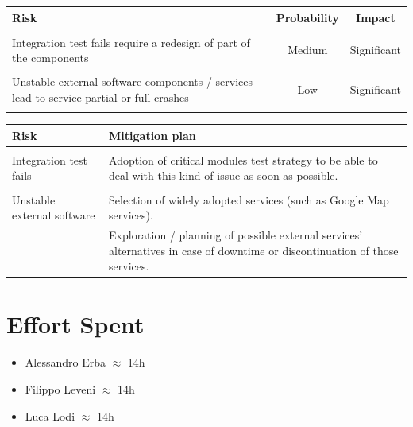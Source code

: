 \documentclass[english]{article}
\begin{document}
	\begin{table}[H]
		\centering
		\begin{tabular}{ p{7cm} c c }
		\textbf{Risk} & \textbf{Probability} & \textbf{Impact} \\ \hline \\
		Integration test fails require a redesign of part of the components & Medium & Significant \\  \\
		Unstable external software components / services lead to service partial or full crashes & Low & Significant \\ \\
				\end{tabular}
	\end{table}
	
	\begin{table}[H]
		\centering
		\begin{tabular}{ p{5cm} p{6cm} }
		\textbf{Risk} & \textbf{Mitigation plan} \\ \hline \\
		 Integration test fails  &  Adoption of critical modules test strategy to be able to deal with this kind of issue as soon as possible. \\  \\
		Unstable external software  & Selection of widely adopted services (such as Google Map services). \\
		& Exploration / planning of possible external services' alternatives in case of downtime or discontinuation of those services. \\
		\end{tabular}
	\end{table}
	
	
	

\pagebreak
\section{Effort Spent}

\begin{itemize}
		\item Alessandro Erba $\approx$ 14h
		\item Filippo Leveni 	$\approx$ 14h
		\item Luca Lodi $\approx$ 14h
	\end{itemize}
\end{document}
